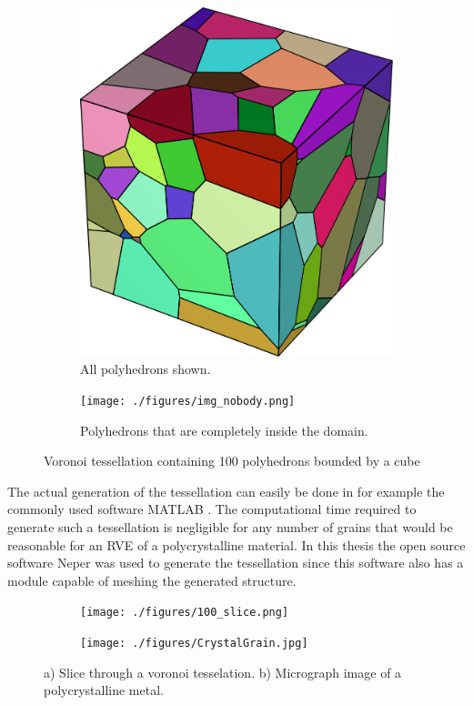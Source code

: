 \documentclass[micro_gen.tex]{subfiles}
\begin{document}
\begin{figure}
\centering
\begin{subfigure}[b]{.5\textwidth}
  \centering
  \includegraphics[width=.5\linewidth]{./figures/img_body.png}
  \caption{All polyhedrons shown.}
  \label{fig:pois_voronoi_a}
\end{subfigure}%
\begin{subfigure}[b]{.5\textwidth}
  \centering
  \texttt{[image: ./figures/img\_nobody.png]}
  \caption{Polyhedrons that are completely inside the domain.}
  \label{fig:pois_voronoi_b}
\end{subfigure}
\caption{Voronoi tessellation containing 100 polyhedrons bounded by a cube}
\label{fig:pois_voronoi}
\end{figure}


 The actual generation of the tessellation can easily be done in for example the commonly used software MATLAB \cite{matlab:voronoi}. The computational time required to generate such a tessellation is negligible for any number of grains that would be reasonable for an RVE of a polycrystalline material. In this thesis the open source software Neper \cite{Quey20111729} was used to generate the tessellation since this software also has a module capable of meshing the generated structure.

\begin{figure}
\centering
\begin{subfigure}[b]{.5\textwidth}
  \centering
  \texttt{[image: ./figures/100\_slice.png]}
  \caption{}
   \label{fig:slice_a}
\end{subfigure}%
\begin{subfigure}[b]{.5\textwidth}
  \centering
  \texttt{[image: ./figures/CrystalGrain.jpg]}
  \caption{}
  \label{fig:slice_b}
\end{subfigure}
\caption{a) Slice through a voronoi tesselation.  b) Micrograph image of a polycrystalline metal.\cite{wiki:grain}}
\label{fig:slice}
\end{figure}
\end{document}

